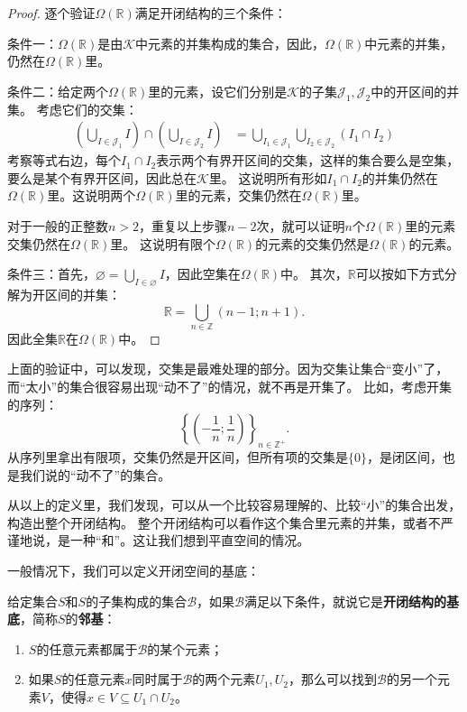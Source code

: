 \documentclass[12pt,UTF8,fontset=none]{ctexbook}
\begin{document}
\begin{appendix}
\begin{proof}
    逐个验证$\Omega(\mathbb{R})$满足开闭结构的三个条件：

    条件一：$\Omega(\mathbb{R})$是由$\mathcal{K}$中元素的并集构成的集合，因此，$\Omega(\mathbb{R})$中元素的并集，仍然在$\Omega(\mathbb{R})$里。

    条件二：给定两个$\Omega(\mathbb{R})$里的元素，设它们分别是$\mathcal{K}$的子集$\mathcal{J}_1, \mathcal{J}_2$中的开区间的并集。
    考虑它们的交集：
    \begin{align*}
        \left(\bigcup_{I \in \mathcal{J}_1} I\right) \cap \left(\bigcup_{I \in \mathcal{J}_2} I\right) &= \bigcup_{I_1 \in \mathcal{J}_1} \bigcup_{I_2 \in \mathcal{J}_2} (I_1 \cap I_2)   
    \end{align*}
    考察等式右边，每个$I_1 \cap I_2$表示两个有界开区间的交集，这样的集合要么是空集，要么是某个有界开区间，因此总在$\mathcal{K}$里。
    这说明所有形如$I_1 \cap I_2$的并集仍然在$\Omega(\mathbb{R})$里。这说明两个$\Omega(\mathbb{R})$里的元素，交集仍然在$\Omega(\mathbb{R})$里。

    对于一般的正整数$n>2$，重复以上步骤$n-2$次，就可以证明$n$个$\Omega(\mathbb{R})$里的元素交集仍然在$\Omega(\mathbb{R})$里。
    这说明有限个$\Omega(\mathbb{R})$的元素的交集仍然是$\Omega(\mathbb{R})$的元素。

    条件三：首先，$\varnothing = \bigcup_{I \in \varnothing} I $，因此空集在$\Omega(\mathbb{R})$中。
    其次，$\mathbb{R}$可以按如下方式分解为开区间的并集：
    $$ \mathbb{R} = \bigcup_{n\in \mathbb{Z}} (n-1;n+1) . $$
    因此全集$\mathbb{R}$在$\Omega(\mathbb{R})$中。

\end{proof}

上面的验证中，可以发现，交集是最难处理的部分。因为交集让集合“变小”了，而“太小”的集合很容易出现“动不了”的情况，就不再是开集了。
比如，考虑开集的序列：
$$ \left\{ \left(-\frac{1}{n};\frac{1}{n}\right)\right\}_{n\in\mathbb{Z}^+}.$$
从序列里拿出有限项，交集仍然是开区间，但所有项的交集是$\{0\}$，是闭区间，也是我们说的“动不了”的集合。

从以上的定义里，我们发现，可以从一个比较容易理解的、比较“小”的集合出发，构造出整个开闭结构。
整个开闭结构可以看作这个集合里元素的并集，或者不严谨地说，是一种“和”。这让我们想到平直空间的情况。

一般情况下，我们可以定义开闭空间的基底：
\begin{df}
    给定集合$S$和$S$的子集构成的集合$\mathcal{B}$，如果$\mathcal{B}$满足以下条件，就说它是\textbf{开闭结构的基底}，简称$S$的\textbf{邻基}：
    \begin{enumerate}
        \item $S$的任意元素都属于$\mathcal{B}$的某个元素；
        \item 如果$S$的任意元素$x$同时属于$\mathcal{B}$的两个元素$U_1, U_2$，那么可以找到$\mathcal{B}$的另一个元素$V$，使得$x\in V\subseteq U_1\cap U_2$。
    \end{enumerate}
\end{df}


\end{appendix}
\end{document}
